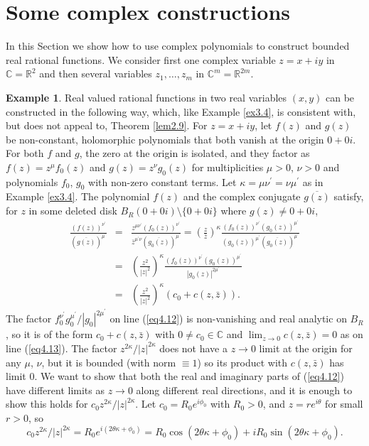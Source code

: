 \documentclass[12pt]{amsart}
\theoremstyle{definition}
\newtheorem{example}[thm]{Example}
\theoremstyle{remark}
\numberwithin{equation}{section}
\newcommand{\re}{\mathbb{R}}
\newcommand{\co}{\mathbb{C}}
\newcommand{\z}{\bar z}
\begin{document}

\section{Some complex constructions}\label{sec4}

In this Section we show how to use complex polynomials to construct bounded real rational functions.  We consider first one complex variable $z=x+iy$ in $\co=\re^2$ and then several variables $z_1,\ldots,z_m$ in $\co^m=\re^{2m}$.

\begin{example}\label{ex3.6}
  Real valued rational functions in two real variables $(x,y)$ can be constructed in the following way, which, like Example \ref{ex3.4}, is consistent with, but does not appeal to, Theorem \ref{lem2.9}.  For $z=x+iy$, let $f(z)$ and $g(z)$ be non-constant, holomorphic polynomials that both vanish at the origin $0+0i$.  For both $f$ and $g$, the zero at the origin is isolated, and they factor as $f(z)=z^\mu f_0(z)$ and $g(z)=z^\nu g_0(z)$ for multiplicities $\mu>0$, $\nu>0$ and polynomials $f_0$, $g_0$ with non-zero constant terms.  Let $\kappa=\mu \nu^\prime=\nu\mu^\prime$ as in Example \ref{ex3.4}.  The polynomial $f(z)$ and the complex conjugate $\overline{g(z)}$ satisfy, for $z$ in some deleted disk $B_R(0+0i)\setminus\{0+0i\}$ where $g(z)\ne0+0i$,
  \begin{eqnarray}
      \frac{(f(z))^{\nu^\prime}}{\left(\overline{g(z)}\right)^{\mu^\prime}}&=&\frac{z^{\mu\nu^\prime}(f_0(z))^{\nu^\prime}}{\z^{{\mu^\prime}\nu}\left(\overline{g_0(z)}\right)^{\mu^\prime}}=\left(\frac{z}{\z}\right)^{\kappa}\frac{(f_0(z))^{\nu^\prime}(g_0(z))^{\mu^\prime}}{(g_0(z))^{\mu^\prime}\left(\overline{g_0(z)}\right)^{\mu^\prime}}\nonumber\\
      &=&\left(\frac{z^2}{|z|^2}\right)^{\kappa}\frac{(f_0(z))^{\nu^\prime}(g_0(z))^{\mu^\prime}}{|g_0(z)|^{2{\mu^\prime}}}\label{eq4.12}\\
      &=&\left(\frac{z^2}{|z|^2}\right)^{\kappa}(c_0+c(z,\z)).\label{eq4.13}
  \end{eqnarray}
  The factor $f_0^{\nu^\prime} g_0^{\mu^\prime}/|g_0|^{2{\mu^\prime}}$ on line (\ref{eq4.12}) is non-vanishing and real analytic on $B_R$, so it is of the form $c_0+c(z,\z)$ with $0\ne c_0\in\co$ and $\displaystyle{\lim_{z\to0}c(z,\z)=0}$ as on line (\ref{eq4.13}).  The factor $z^{2\kappa}/|z|^{2\kappa}$ does not have a $z\to0$ limit at the origin for any $\mu$, $\nu$, but it is bounded (with norm $\equiv1$) so its product with $c(z,\z)$ has limit $0$.  We want to show that both the real and imaginary parts of (\ref{eq4.12}) have different limits as $z\to0$ along different real directions, and it is enough to show this holds for $c_0z^{2\kappa}/|z|^{2\kappa}$.  Let $c_0=R_0e^{i\phi_0}$ with $R_0>0$, and $z=re^{i\theta}$ for small $r>0$, so $$c_0z^{2\kappa}/|z|^{2\kappa}=R_0e^{i(2\theta\kappa+\phi_0)}=R_0\cos(2\theta\kappa+\phi_0)+iR_0\sin(2\theta\kappa+\phi_0).$$ 

\end{example}
\end{document}
